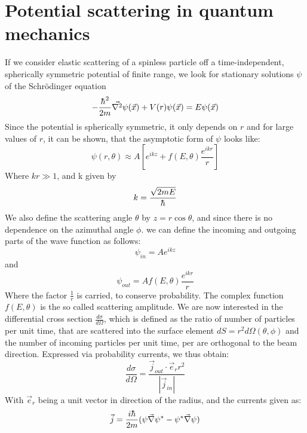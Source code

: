 \documentclass[a4paper]{article}
\newcommand{\hbbar}{{\raisebox{0.05ex}{$\mathchar '26$}\mkern -9mu\raisebox{-0.15ex}{$\mathchar '26$}\mkern -9muh}}
\begin{document}
\section{Potential scattering in quantum mechanics}
If we consider elastic scattering of a spinless particle off a
time-independent, spherically symmetric potential of finite range, we look for
stationary solutions $\psi$ of the Schrödinger equation
\begin{equation}
    -\frac{\hbbar^2}{2m}\Vec{\nabla^2}\psi(\Vec{x})+V(r)\psi(\Vec{x})=E\psi(\Vec{x})
\end{equation}
Since the potential is spherically symmetric, it only depends on $r$ and for
large values of $r$, it can be shown, that the asymptotic form of $\psi$ looks
like:
\begin{equation}
    \psi(r,\theta)\approx A[e^{ikz}+f(E,\theta)\frac{e^{ikr}}{r}]
\end{equation}
Where $kr\gg 1$, and k given by
\begin{equation}
    k=\frac{\sqrt{2mE}}{\hbbar}
\end{equation}
We also define the scattering angle $\theta$ by $z=r\cos{\theta}$, and since
there is no dependence on the azimuthal angle $\phi$. we can define the
incoming and outgoing parts of the wave function as follows:
\begin{equation}
    \psi_{in}=Ae^{ikz}
\end{equation}
and
\begin{equation}
    \psi_{out}=Af(E,\theta)\frac{e^{ikr}}{r}
\end{equation}
Where the factor $\frac{1}{r}$ is carried, to conserve probability. The complex
function $f(E,\theta)$ is the so called scattering amplitude. We are now
interested in the differential cross section $\frac{d\sigma}{d\Omega}$, which
is defined as the ratio of number of particles per unit time, that are
scattered into the surface element $dS=r^2d\Omega(\theta,\phi)$ and the number
of incoming particles per unit time, per are orthogonal to the beam direction.
Expressed via probability currents, we thus obtain:
\begin{equation}
    \frac{d\sigma}{d\Omega}=\frac{\Vec{j}_{out}\cdot \Vec{e}_rr^2}{|\Vec{j}_{in}|}
\end{equation}
With $\Vec{e}_r$ being a unit vector in direction of the radius, and the currents given as:
\begin{equation}
\Vec{j}=\frac{i\hbbar}{2m}(\psi\Vec{\nabla}\psi^*-\psi^*\Vec{\nabla}\psi)
\end{equation}
\end{document}
